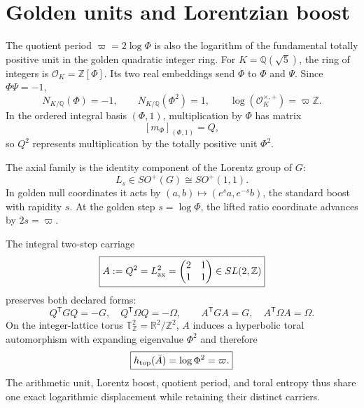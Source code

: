 \documentclass[10pt]{article}
\newcommand{\R}{\mathbb R}
\newcommand{\Z}{\mathbb Z}
\newcommand{\Q}{\mathbb Q}
\begin{document}
\section{Golden units and Lorentzian boost}\label{sec:unitboost}
The quotient period $\varpi=2\log\Phi$ is also the logarithm of the fundamental totally positive unit in the golden quadratic integer ring. For $K=\Q(\sqrt5)$, the ring of integers is $\mathcal O_K=\Z[\Phi]$. Its two real embeddings send $\Phi$ to $\Phi$ and $\Psi$. Since $\Phi\Psi=-1$,
\begin{equation}
N_{K/\Q}(\Phi)=-1,\qquad
N_{K/\Q}(\Phi^2)=1,\qquad
\boxed{\log(\mathcal O_K^{\times,+})=\varpi\Z.}
\end{equation}
In the ordered integral basis $(\Phi,1)$, multiplication by $\Phi$ has matrix
\begin{equation}
\boxed{[m_\Phi]_{(\Phi,1)}=Q,}
\end{equation}
so $Q^2$ represents multiplication by the totally positive unit $\Phi^2$.

The axial family is the identity component of the Lorentz group of $G$:
\begin{equation}
\boxed{L_s\in SO^+(G)\cong SO^+(1,1).}
\end{equation}
In golden null coordinates it acts by
$(a,b)\mapsto(e^sa,e^{-s}b)$, the standard boost with rapidity $s$. At the golden step $s=\log\Phi$, the lifted ratio coordinate advances by $2s=\varpi$.

The integral two-step carriage
\begin{equation}
\boxed{A:=Q^2=L_{\rm ax}^2=\begin{pmatrix}2&1\\1&1\end{pmatrix}\in SL(2,\Z)}
\end{equation}
preserves both declared forms:
\begin{equation}
Q^{\mathsf T}GQ=-G,\quad Q^{\mathsf T}\Omega Q=-\Omega,\qquad
\boxed{A^{\mathsf T}GA=G,\quad A^{\mathsf T}\Omega A=\Omega.}
\end{equation}
On the integer-lattice torus $\mathbb T_{\Z}^2=\R^2/\Z^2$, $A$ induces a hyperbolic toral automorphism with expanding eigenvalue $\Phi^2$ and therefore
\begin{equation}
\boxed{h_{\rm top}(\bar A)=\log\Phi^2=\varpi.}
\end{equation}
The arithmetic unit, Lorentz boost, quotient period, and toral entropy thus share one exact logarithmic displacement while retaining their distinct carriers.
\end{document}
